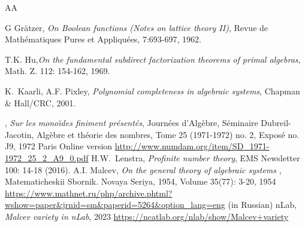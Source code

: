 \documentclass[11pt,a4paper]{article}
\theoremstyle{definition} %
\newcommand\+[1]{\mathcal{#1}} %
\begin{document}
{\begin{thebibliography}{AA}

{\sc  G  Gr\"atzer}, {\em On Boolean functions (Notes on lattice theory II)},
Revue de Math{\'e}matiques Pures et Appliqu{\'e}es, 7:693-697, 1962.



{\sc T.K. Hu},{\em On the fundamental subdirect factorization theorems of primal algebras}, Math. Z. 112: 154-162, 1969. 

{\sc K.~Kaarli, A.F. Pixley},
{\em Polynomial completeness in algebraic systems},
Chapman \& Hall/CRC, 2001.




%
,
{\em  Sur les mono{\"{\i}}des finiment pr\'esent\'es},  
Journ\'ees d'Alg\`ebre, S\'eminaire Dubreil-Jacotin,  Alg\`ebre et th\'eorie des nombres, Tome 25 (1971-1972) no. 2, Expos\'e no. J9, 1972 Paris 
Online version
\url{http://www.numdam.org/item/SD\_1971-1972\_25\_2\_A9\_0.pdf}
%
 {\sc  H.W.~Lenstra},
{\em Profinite number theory},
EMS Newsletter 100: 14-18 (2016).
%
 {\sc A.I. Malcev},
{\em On the general theory of algebraic systems },
Matematicheskii Sbornik. Novaya Seriya, 1954, Volume 35(77):  3-20,
1954 \url{https://www.mathnet.ru/php/archive.phtml?wshow=paper&jrnid=sm&paperid=5264&option_lang=eng} (in Russian)
%
%
 {\sc nLab},
{\em Malcev variety in nLab},
2023 \url{https://ncatlab.org/nlab/show/Malcev+variety}


\end{thebibliography}}
\end{document}
